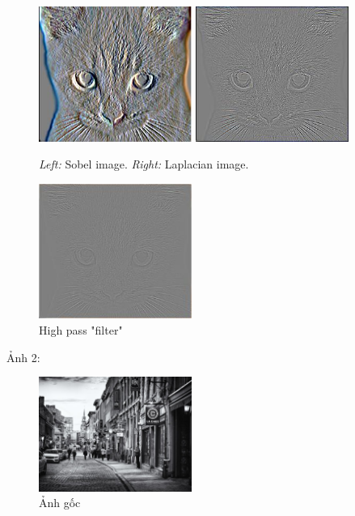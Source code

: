 \begin{figure}[H]
    \centering
    \includegraphics[width=5cm]{images/results_part1/cat/sobel_image.jpg}
    \includegraphics[width=5cm]{images/results_part1/cat/laplacian_image.jpg}
    \caption{\emph{Left:} Sobel image. \emph{Right:} Laplacian image.}
\end{figure}

\begin{figure}[H]
    \centering
    \includegraphics[width=5cm]{images/results_part1/cat/high_pass_image.jpg}
    \caption{High pass "filter"}
\end{figure}

Ảnh 2:
\begin{figure}[h]
    \centering
    \includegraphics[width=5cm]{images/results_part1/image1/6_image1.jpg}
    \caption{Ảnh gốc}
\end{figure}

